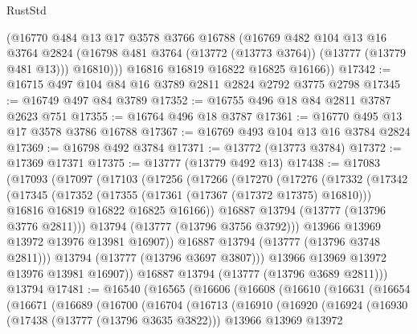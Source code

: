 \begin{lexlean}{RustStd}
\begin{coremodule}
          (@16770
            @484
            @13
            @17
            @3578
            @3766
            @16788
            (@16769
              @482
              @104
              @13
              @16
              @3764
              @2824
              (@16798 @481 @3764 (@13772 (@13773 @3764)) (@13777 (@13779 @481 @13)))
              @16810)))
        @16816
        @16819
        @16822
        @16825
        @16166))
@17342 := @16715 @497 @104 @84 @16 @3789 @2811 @2824 @2792 @3775 @2798
@17345 := @16749 @497 @84 @3789
@17352 := @16755 @496 @18 @84 @2811 @3787 @2623 @751
@17355 := @16764 @496 @18 @3787
@17361 := @16770 @495 @13 @17 @3578 @3786 @16788
@17367 := @16769 @493 @104 @13 @16 @3784 @2824
@17369 := @16798 @492 @3784
@17371 := @13772 (@13773 @3784)
@17372 := @17369 @17371
@17375 := @13777 (@13779 @492 @13)
@17438 := @17083
    (@17093
      (@17097
        (@17103
          (@17256
            (@17266
              (@17270
                (@17276
                  (@17332
                    (@17342
                      (@17345
                        (@17352
                          (@17355 (@17361 (@17367 (@17372 @17375) @16810)))
                          @16816
                          @16819
                          @16822
                          @16825
                          @16166))
                      @16887
                      @13794
                      (@13777 (@13796 @3776 @2811)))
                    @13794
                    (@13777 (@13796 @3756 @3792)))
                  @13966
                  @13969
                  @13972
                  @13976
                  @13981
                  @16907))
              @16887
              @13794
              (@13777 (@13796 @3748 @2811)))
            @13794
            (@13777 (@13796 @3697 @3807)))
          @13966
          @13969
          @13972
          @13976
          @13981
          @16907))
      @16887
      @13794
      (@13777 (@13796 @3689 @2811)))
    @13794
@17481 := @16540
    (@16565
      (@16606
        (@16608
          (@16610
            (@16631
              (@16654
                (@16671
                  (@16689
                    (@16700
                      (@16704
                        (@16713
                          (@16910
                            (@16920
                              (@16924
                                (@16930
                                  (@17438 (@13777 (@13796 @3635 @3822)))
                                  @13966
                                  @13969
                                  @13972

\end{coremodule}
\end{lexlean}
